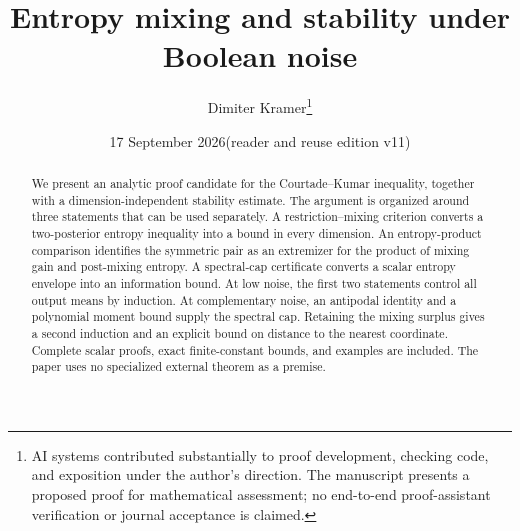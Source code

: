 \documentclass[11pt]{article}
\title{Entropy mixing and stability under Boolean noise}
\author{Dimiter Kramer\thanks{AI systems contributed substantially to proof development, checking code, and exposition under the author's direction. The manuscript presents a proposed proof for mathematical assessment; no end-to-end proof-assistant verification or journal acceptance is claimed.}}
\date{17 September 2026\quad\textnormal{(reader and reuse edition v11)}}
\numberwithin{equation}{section}
\theoremstyle{definition}\newtheorem{definition}[theorem]{Definition}
\theoremstyle{remark}\newtheorem{remark}[theorem]{Remark}
\begin{document}
\maketitle
\begin{abstract}
We present an analytic proof candidate for the Courtade--Kumar inequality, together with a dimension-independent stability estimate. The argument is organized around three statements that can be used separately. A restriction--mixing criterion converts a two-posterior entropy inequality into a bound in every dimension. An entropy-product comparison identifies the symmetric pair as an extremizer for the product of mixing gain and post-mixing entropy. A spectral-cap certificate converts a scalar entropy envelope into an information bound. At low noise, the first two statements control all output means by induction. At complementary noise, an antipodal identity and a polynomial moment bound supply the spectral cap. Retaining the mixing surplus gives a second induction and an explicit bound on distance to the nearest coordinate. Complete scalar proofs, exact finite-constant bounds, and examples are included. The paper uses no specialized external theorem as a premise.
\end{abstract}








\appendix


\end{document}
